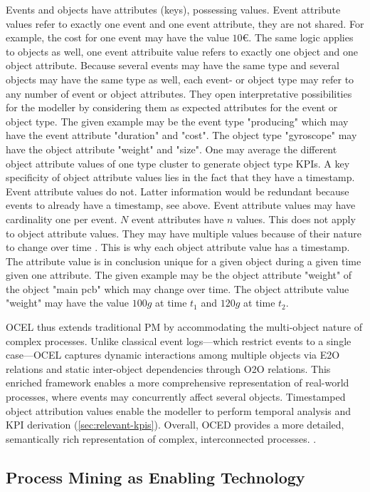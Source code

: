 Events and objects have attributes (keys), possessing values. Event attribute values refer to exactly one event and one event attribute, they are not shared. For example, the cost for one event may have the value $10€$. The same logic applies to objects as well, one event attribuite value refers to exactly one object and one object attribute. Because several events may have the same type and several objects may have the same type as well, each event- or object type may refer to any number of event or object attributes. They open interpretative possibilities for the modeller by considering them as expected attributes for the event or object type. The given example may be the event type "producing" which may have the event attribute "duration" and "cost". The object type "gyroscope" may have the object attribute "weight" and "size". One may average the different object attribute values of one type cluster to generate object type KPIs. A key specificity of object attribute values lies in the fact that they have a timestamp. Event attribute values do not. Latter information would be redundant because events to already have a timestamp, see above. Event attribute values may have cardinality one per event. $N$ event attributes have $n$ values. This does not apply to object attribute values. They may have multiple values because of their nature to change over time \autocite{van2023object}. This is why each object attribute value has a timestamp. The attribute value is in conclusion unique for a given object during a given time given one attribute. The given example may be the object attribute "weight" of the object "main pcb" which may change over time. The object attribute value "weight" may have the value $100g$ at time $t_1$ and $120g$ at time $t_2$.

OCEL thus extends traditional PM by accommodating the  multi-object nature of complex processes. Unlike classical event logs—which restrict events to a single case—OCEL captures dynamic interactions among multiple objects via E2O relations and static inter-object dependencies through O2O relations. This enriched framework enables a more comprehensive representation of real-world processes, where events may concurrently affect several objects. Timestamped object attribution values enable the modeller to perform temporal analysis and KPI derivation (\autoref{sec:relevant-kpis}). Overall, OCED provides a more detailed, semantically rich representation of complex, interconnected processes. \autocite{van2023object}.

\subsection{Process Mining as Enabling Technology}
\label{sec:process-mining-enabling-technology}

